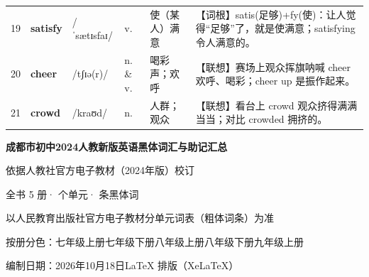 \documentclass[UTF8,a4paper,11pt,oneside]{ctexbook}
\newcommand{\fivecolorbar}[1]{%
  \makebox[#1][c]{%
    {\color{volA}\rule{\dimexpr#1/5\relax}{5.5pt}}%
    {\color{volB}\rule{\dimexpr#1/5\relax}{5.5pt}}%
    {\color{volC}\rule{\dimexpr#1/5\relax}{5.5pt}}%
    {\color{volD}\rule{\dimexpr#1/5\relax}{5.5pt}}%
    {\color{volE}\rule{\dimexpr#1/5\relax}{5.5pt}}}}
\newcommand{\cellword}[1]{{\bfseries\textcolor{wordcol}{#1}}}
\newcommand{\cellipa}[1]{{\footnotesize\textcolor{ipacol}{#1}}}
\newcommand{\cellpos}[1]{\textcolor{poscol}{#1}}
\newcommand{\cellno}[1]{\textcolor{volcolor!75!black}{#1}}
\begin{document}
{\begin{longtable}{@{}C{0.045\textwidth}L{0.155\textwidth}L{0.175\textwidth}C{0.070\textwidth}L{0.180\textwidth}L{0.282\textwidth}@{}}
 \cellno{19} & \cellword{satisfy} & \cellipa{/ˈsætɪsfaɪ/} & \cellpos{v.} & 使（某人）满意 & \textcolor{tagRoot}{【词根】}satis(足够)+fy(使)：让人觉得“足够”了，就是使满意；satisfying 令人满意的。 \\
\cellno{20} & \cellword{cheer} & \cellipa{/tʃɪə(r)/} & \cellpos{n.  \& v.} & 喝彩声；欢呼 & \textcolor{tagAssoc}{【联想】}赛场上观众挥旗呐喊 cheer 欢呼、喝彩；cheer up 是振作起来。 \\
 \cellno{21} & \cellword{crowd} & \cellipa{/kraʊd/} & \cellpos{n.} & 人群；观众 & \textcolor{tagAssoc}{【联想】}看台上 crowd 观众挤得满满当当；对比 crowded 拥挤的。 \\
\end{longtable}
}

\clearpage
\thispagestyle{empty}
\vspace*{\fill}
\begin{center}
\noindent\fivecolorbar{0.62\linewidth}\par
\vspace{1.1cm}
{\sffamily\fontsize{20pt}{26pt}\selectfont\bfseries\color{mainblue} 成都市初中2024人教新版英语黑体词汇与助记汇总\par}
\vspace{0.55cm}
{\sffamily\large\color{accent} 依据人教社官方电子教材（2024年版）校订\par}
\vspace{1.0cm}
{\sffamily\large\color{textgray} 全书 5 册\quad· 个单元\quad· 条黑体词\par}
\vspace{0.75cm}
{\sffamily\color{textgray} 以人民教育出版社官方电子教材分单元词表（粗体词条）为准\par}
\vspace{0.25cm}
{\sffamily\color{textgray} 按册分色：\textcolor{volA}{七年级上册}\quad\textcolor{volB}{七年级下册}\quad\textcolor{volC}{八年级上册}\quad\textcolor{volD}{八年级下册}\quad\textcolor{volE}{九年级上册}\par}
\vspace{1.4cm}
\noindent\fivecolorbar{0.62\linewidth}\par
\vspace{0.85cm}
{\sffamily\color{textgray} 编制日期：2026年10月18日\quad\LaTeX{} 排版（XeLaTeX）\par}
\end{center}
\vfill
\end{document}

